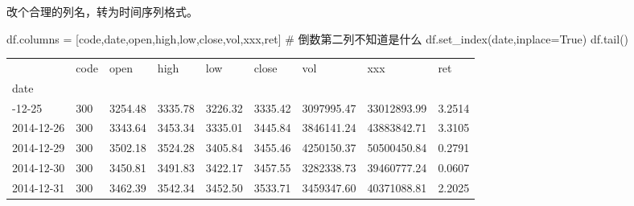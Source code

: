 \documentclass[
  letterpaper,
  DIV=11,
  numbers=noendperiod]{scrreprt}
\newenvironment{Shaded}{\begin{snugshade}}{\end{snugshade}}
\newcommand{\CommentTok}[1]{\textcolor[rgb]{0.37,0.37,0.37}{#1}}
\newcommand{\NormalTok}[1]{\textcolor[rgb]{0.00,0.23,0.31}{#1}}
\newcommand{\OperatorTok}[1]{\textcolor[rgb]{0.37,0.37,0.37}{#1}}
\newcommand{\StringTok}[1]{\textcolor[rgb]{0.13,0.47,0.30}{#1}}
\newcommand{\VariableTok}[1]{\textcolor[rgb]{0.07,0.07,0.07}{#1}}
\begin{document}
改个合理的列名，转为时间序列格式。

\begin{Shaded}
\begin{Highlighting}[]
\NormalTok{df.columns }\OperatorTok{=}\NormalTok{ [}\StringTok{\textquotesingle{}code\textquotesingle{}}\NormalTok{,}\StringTok{\textquotesingle{}date\textquotesingle{}}\NormalTok{,}\StringTok{\textquotesingle{}open\textquotesingle{}}\NormalTok{,}\StringTok{\textquotesingle{}high\textquotesingle{}}\NormalTok{,}\StringTok{\textquotesingle{}low\textquotesingle{}}\NormalTok{,}\StringTok{\textquotesingle{}close\textquotesingle{}}\NormalTok{,}\StringTok{\textquotesingle{}vol\textquotesingle{}}\NormalTok{,}\StringTok{\textquotesingle{}xxx\textquotesingle{}}\NormalTok{,}\StringTok{\textquotesingle{}ret\textquotesingle{}}\NormalTok{] }\CommentTok{\# 倒数第二列不知道是什么}
\NormalTok{df.set\_index(}\StringTok{\textquotesingle{}date\textquotesingle{}}\NormalTok{,inplace}\OperatorTok{=}\VariableTok{True}\NormalTok{)}
\NormalTok{df.tail()}
\end{Highlighting}
\end{Shaded}

\begin{longtable}[]{@{}lllllllll@{}}
\toprule\noalign{}
& code & open & high & low & close & vol & xxx & ret \\
date & & & & & & & & \\
\midrule\noalign{}
\endhead
\bottomrule\noalign{}
\endlastfoot
2014-12-25 & 300 & 3254.48 & 3335.78 & 3226.32 & 3335.42 & 3097995.47 &
33012893.99 & 3.2514 \\
2014-12-26 & 300 & 3343.64 & 3453.34 & 3335.01 & 3445.84 & 3846141.24 &
43883842.71 & 3.3105 \\
2014-12-29 & 300 & 3502.18 & 3524.28 & 3405.84 & 3455.46 & 4250150.37 &
50500450.84 & 0.2791 \\
2014-12-30 & 300 & 3450.81 & 3491.83 & 3422.17 & 3457.55 & 3282338.73 &
39460777.24 & 0.0607 \\
2014-12-31 & 300 & 3462.39 & 3542.34 & 3452.50 & 3533.71 & 3459347.60 &
40371088.81 & 2.2025 \\
\end{longtable}
\end{document}
